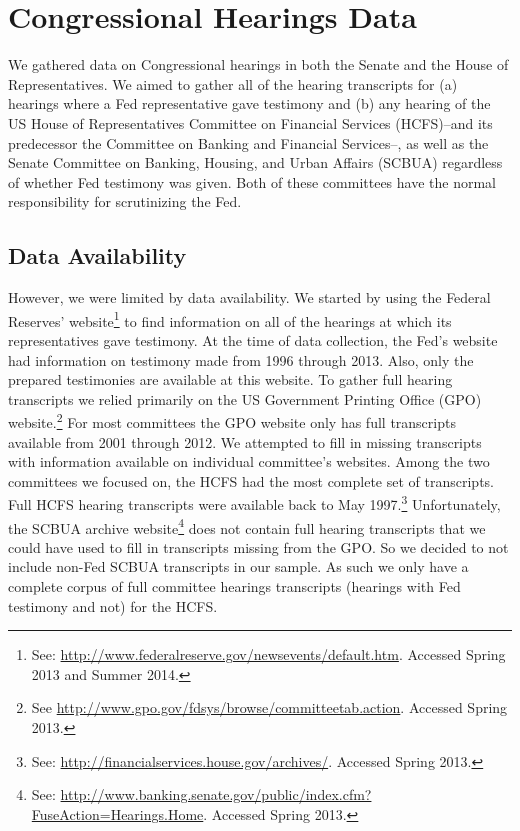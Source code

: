 \documentclass[a4paper]{article}\usepackage[]{graphicx}\usepackage[]{color}
\begin{document}
\section{Congressional Hearings Data}

We gathered data on Congressional hearings in both the Senate and the House of Representatives. We aimed to gather all of the hearing transcripts for (a) hearings where a Fed representative gave testimony and (b) any hearing of the US House of Representatives Committee on Financial Services (HCFS)--and its predecessor the Committee on Banking and Financial Services--, as well as the Senate Committee on Banking, Housing, and Urban Affairs (SCBUA) regardless of whether Fed testimony was given. Both of these committees have the normal responsibility for scrutinizing the Fed.

\subsection{Data Availability}

However, we were limited by data availability. We started by using the Federal Reserves' website\footnote{See: \url{http://www.federalreserve.gov/newsevents/default.htm}. Accessed Spring 2013 and Summer 2014.} to find information on all of the hearings at which its representatives gave testimony. At the time of data collection, the Fed's website had information on testimony made from 1996 through 2013. Also, only the prepared testimonies are available at this website. To gather full hearing transcripts we relied primarily on the US Government Printing Office (GPO) website.\footnote{See \url{http://www.gpo.gov/fdsys/browse/committeetab.action}. Accessed Spring 2013.} For most committees the GPO website only has full transcripts available from 2001 through 2012. We attempted to fill in missing transcripts with information available on individual committee's websites. Among the two committees we focused on, the HCFS had the most complete set of transcripts. Full HCFS hearing transcripts were available back to May 1997.\footnote{See: \url{http://financialservices.house.gov/archives/}. Accessed Spring 2013.} Unfortunately, the SCBUA archive website\footnote{See: \url{http://www.banking.senate.gov/public/index.cfm?FuseAction=Hearings.Home}. Accessed Spring 2013.} does not contain full hearing transcripts that we could have used to fill in transcripts missing from the GPO. So we decided to not include non-Fed SCBUA transcripts in our sample. As such we only have a complete corpus of full committee hearings transcripts (hearings with Fed testimony and not) for the HCFS.
\end{document}
